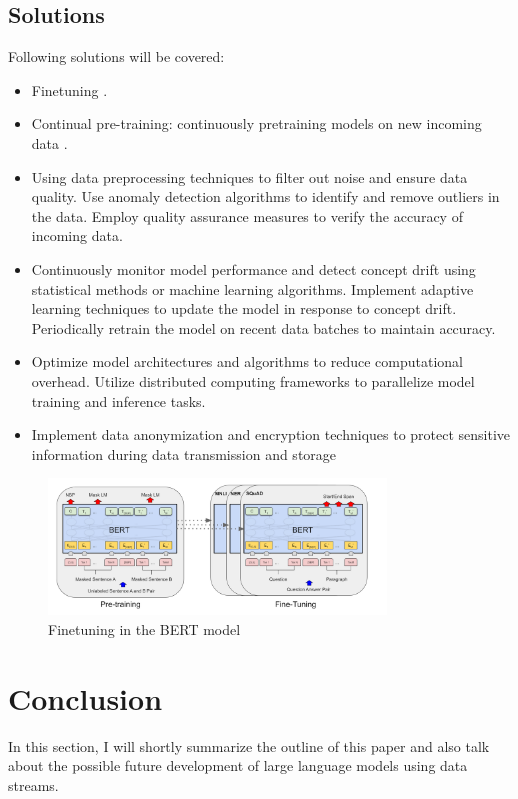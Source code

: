 \documentclass[runningheads]{llncs}
\begin{document}
\subsection{Solutions}
Following solutions will be covered:
\begin{itemize}
    \item Finetuning \cite{Devlin18}. 
    \item Continual pre-training: continuously pretraining models on new incoming data \cite{Gupta23}.
    \item Using data preprocessing techniques to filter out noise and ensure data quality. Use anomaly detection algorithms to identify and remove outliers in the data. Employ quality assurance measures to verify the accuracy of incoming data.
    \item Continuously monitor model performance and detect concept drift using statistical methods or machine learning algorithms. Implement adaptive learning techniques to update the model in response to concept drift. Periodically retrain the model on recent data batches to maintain accuracy.
    \item Optimize model architectures and algorithms to reduce computational overhead. Utilize distributed computing frameworks to parallelize model training and inference tasks.
    \item Implement data anonymization and encryption techniques to protect sensitive information during data transmission and storage
\end{itemize}
\begin{figure}[]
  \centering
  \includegraphics[width=0.8\textwidth]{BERT Finetuning.png}
  \caption{Finetuning in the BERT model \cite{Devlin18}}
  \label{fig:bert_finetune}
\end{figure}

\section{Conclusion}
In this section, I will shortly summarize the outline of this paper and also talk about the possible future development of large language models using data streams.
\end{document}
